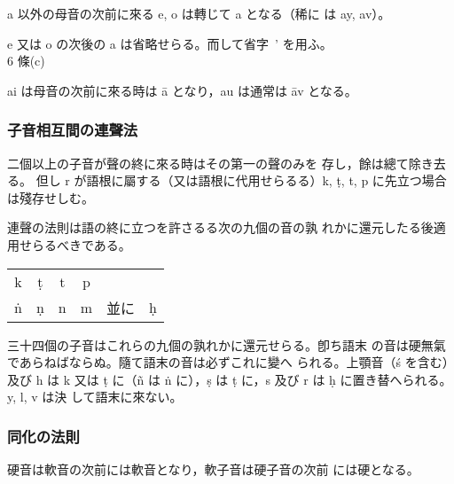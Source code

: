 \numberParagraph
a 以外の母音の次前に來る e, o は轉じて a となる（稀に
は ay, av）。

e 又は o の次後の a は省略せらる。而して省字 \,' を用ふ。\\
\hfill 6 條(c)

\numberParagraph
ai は母音の次前に來る時は ā となり，au は通常は āv となる。


\subsubsection{子音相互間の連聲法}
\numberParagraph
二個以上の子音が聲の終に來る時はその第一の聲のみを
存し，餘は總て除き去る。
但し r が語根に屬する（又は語根に代用せらるる）k, ṭ, t, p
に先立つ場合は殘存せしむ。

\numberParagraph \label{np:17}
連聲の法則は語の終に立つを許さるる次の九個の音の孰
れかに還元したる後適用せらるべきである。

\begin{center}
\begin{tabular}{cccccc}
  k & ṭ & t & p & & \\
  ṅ & ṇ & n & m & 並に & ḥ
\end{tabular}
\end{center}
三十四個の子音はこれらの九個の孰れかに還元せらる。卽ち語末
の音は硬無氣であらねばならぬ。隨て語末の音は必ずこれに變へ
られる。上顎音（ś を含む）及び h は k 又は ṭ に（ñ は ṅ
に），ṣ は ṭ に，s 及び r は ḥ に置き替へられる。y, l, v は決
して語末に來ない。

\subsubsection{同化の法則}
\numberParagraph
硬音は軟音の次前には軟音となり，軟子音は硬子音の次前
には硬となる。

